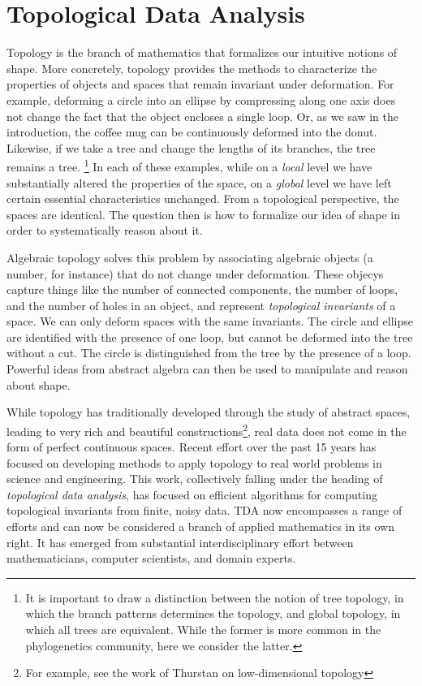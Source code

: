 
\section{Topological Data Analysis}

Topology is the branch of mathematics that formalizes our intuitive notions of shape.
More concretely, topology provides the methods to characterize the properties of objects and spaces that remain invariant under deformation.
For example, deforming a circle into an ellipse by compressing along one axis does not change the fact that the object encloses a single loop.
Or, as we saw in the introduction, the coffee mug can be continuously deformed into the donut.
Likewise, if we take a tree and change the lengths of its branches, the tree remains a tree.
\footnote{It is important to draw a distinction between the notion of tree topology, in which the branch patterns determines the topology, and global topology, in which all trees are equivalent. While the former is more common in the phylogenetics community, here we consider the latter.}
In each of these examples, while on a \emph{local} level we have substantially altered the properties of the space, on a \emph{global} level we have left certain essential characteristics unchanged.
From a topological perspective, the spaces are identical.
The question then is how to formalize our idea of shape in order to systematically reason about it.

Algebraic topology solves this problem by associating algebraic objects (a number, for instance) that do not change under deformation.
These objecys capture things like the number of connected components, the number of loops, and the number of holes in an object, and represent \emph{topological invariants} of a space.
We can only deform spaces with the same invariants.
The circle and ellipse are identified with the presence of one loop, but cannot be deformed into the tree without a cut.
The circle is distinguished from the tree by the presence of a loop.
Powerful ideas from abstract algebra can then be used to manipulate and reason about shape.

While topology has traditionally developed through the study of abstract spaces, leading to very rich and beautiful constructions\footnote{For example, see the work of Thurstan on low-dimensional topology}, real data does not come in the form of perfect continuous spaces.
Recent effort over the past 15 years has focused on developing methods to apply topology to real world problems in science and engineering.
This work, collectively falling under the heading of \emph{topological data analysis}, has focused on efficient algorithms for computing topological invariants from finite, noisy data.
TDA now encompasses a range of efforts and can now be considered a branch of applied mathematics in its own right.
It has emerged from substantial interdisciplinary effort between mathematicians, computer scientists, and domain experts.

